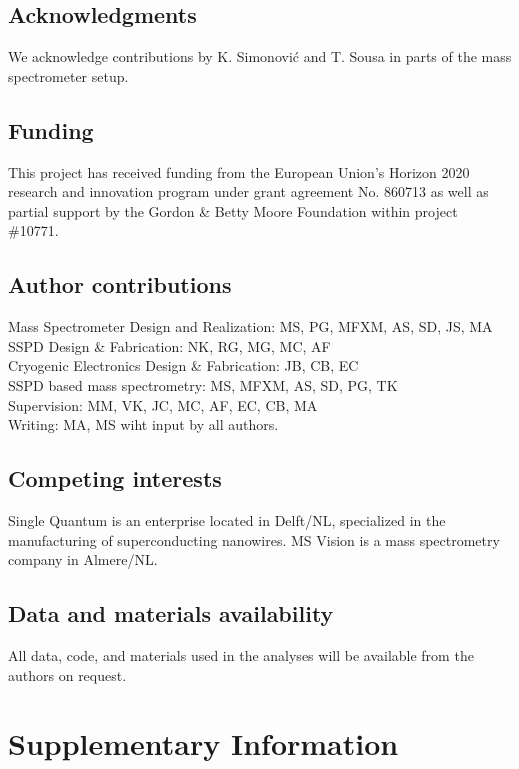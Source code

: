 \documentclass[12pt]{article}
\begin{document}
\subsection*{Acknowledgments}
We acknowledge contributions by K. Simonović and T. Sousa in parts of the mass spectrometer setup.

\subsection*{Funding}  
This project has received funding from the European Union’s Horizon 2020 research and innovation program under grant agreement No. 860713 as well as partial support by the Gordon \& Betty Moore Foundation within project \#10771. 

\subsection*{Author contributions}  
Mass Spectrometer Design and Realization: MS, PG, MFXM, AS, SD, JS, MA\\
SSPD Design \& Fabrication: NK, RG, MG, MC, AF\\
Cryogenic Electronics Design \& Fabrication: JB, CB, EC\\
SSPD based mass spectrometry: MS, MFXM, AS, SD, PG, TK\\
Supervision: MM, VK, JC, MC, AF, EC, CB, MA \\
Writing: MA, MS wiht input by all authors.

\subsection*{Competing interests} 
Single Quantum is an enterprise located in Delft/NL, specialized in the manufacturing of superconducting nanowires.  MS Vision is a mass spectrometry company in Almere/NL.

\subsection*{Data and materials availability} 	
All data, code, and materials used in the analyses will be available from the authors on request.

\newpage
\section*{Supplementary Information}
\setcounter{figure}{0}
\renewcommand{\thefigure}{S\arabic{figure}} %
\renewcommand{\thetable}{S\arabic{table}} %
\end{document}
